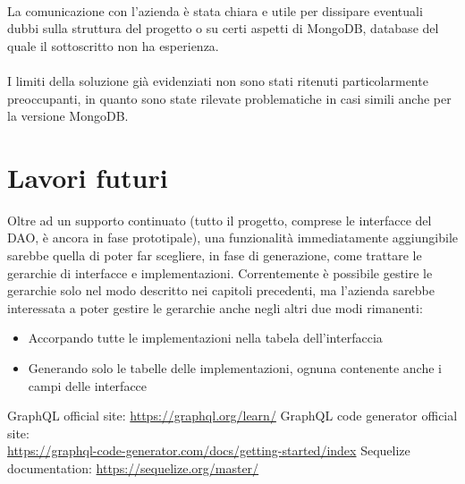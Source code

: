 \documentclass[a4paper, 12pt]{report}
\begin{document}
      \paragraph*{}
        La comunicazione con l'azienda è stata chiara e utile per dissipare eventuali dubbi sulla struttura del progetto o su certi aspetti di MongoDB, database del quale il sottoscritto non ha esperienza.
      \paragraph*{}
        I limiti della soluzione già evidenziati non sono stati ritenuti particolarmente preoccupanti, in quanto sono state rilevate problematiche in casi simili anche per la versione MongoDB.
      \section*{Lavori futuri}
        Oltre ad un supporto continuato (tutto il progetto, comprese le interfacce del DAO, è ancora in fase prototipale), una funzionalità immediatamente aggiungibile sarebbe quella di poter far scegliere, in fase di generazione, come trattare le gerarchie di interfacce e implementazioni.
        Correntemente è possibile gestire le gerarchie solo nel modo descritto nei capitoli precedenti, ma l'azienda sarebbe interessata a poter gestire le gerarchie anche negli altri due modi rimanenti:
        \begin{itemize}
          \item Accorpando tutte le implementazioni nella tabela dell'interfaccia
          \item Generando solo le tabelle delle implementazioni, ognuna contenente anche i campi delle interfacce
        \end{itemize}
    \newpage
    \begin{thebibliography}{3}
      GraphQL official site: \href{https://graphql.org/learn/}{https://graphql.org/learn/}
      GraphQL code generator official site:\\\href{https://graphql-code-generator.com/docs/getting-started/index}{https://graphql-code-generator.com/docs/getting-started/index}
      Sequelize documentation: \href{https://sequelize.org/master/}{https://sequelize.org/master/}
    \end{thebibliography}
\end{document}
